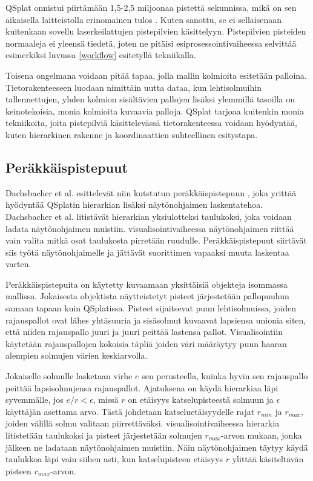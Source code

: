 QSplat onnistui piirtämään 1,5-2,5 miljoonaa pistettä sekunnissa, mikä on sen aikaisella laitteistolla erinomainen tulos \cite{qsplat}. Kuten sanottu, se ei sellaisenaan kuitenkaan sovellu laserkeilattujen pistepilvien käsittelyyn. Pistepilvien pisteiden normaaleja ei yleensä tiedetä, joten ne pitäisi esiprosessointivaiheessa selvittää esimerkiksi luvussa \ref{workflow} esitetyllä tekniikalla. 

Toisena ongelmana voidaan pitää tapaa, jolla mallin kolmioita esitetään palloina. Tietorakenteeseen luodaan nimittäin uutta dataa, kun lehtisolmuihin tallennettujen, yhden kolmion sisältävien pallojen lisäksi ylemmillä tasoilla on keinotekoisia, monia kolmioita kuvaavia palloja. QSplat tarjoaa kuitenkin monia tekniikoita, joita pistepilviä käsittelevässä tietorakenteessa voidaan hyödyntää, kuten hierarkinen rakenne ja koordinaattien suhteellinen esitystapa.

\subsection{Peräkkäispistepuut}
Dachsbacher et al. esittelevät niin kutstutun peräkkäispistepuun , joka yrittää hyödyntää QSplatin hierarkian lisäksi näytönohjaimen laskentatehoa. Dachsbacher et al. litistävät hierarkian yksiulotteksi taulukoksi, joka voidaan ladata näytönohjaimen muistiin. visualisointivaiheessa näytönohjaimen riittää vain valita mitkä osat taulukosta pirretään ruudulle. Peräkkäispistepuut siirtävät siis työtä näytönohjaimelle ja jättävät suorittimen vapaaksi muuta laskentaa varten. \cite{spt}

Peräkkäispistepuita on käytetty kuvaamaan yksittäisiä objekteja isommassa mallissa. Jokaisesta objektista näytteistetyt pisteet järjestetään pallopuuhun samaan tapaan kuin QSplatissa. Pisteet sijaitsevat puun lehtisolmuissa, joiden rajauspallot ovat lähes yhtäsuuria ja sisäsolmut kuvaavat lapsiensa unionia siten, että niiden rajauspallo juuri ja juuri peittää lastensa pallot. Visualisointiin käytetään rajauspallojen kokoisia täpliä joiden väri määräytyy puun haaran alempien solmujen värien keskiarvolla. \cite{spt}

Jokaiselle solmulle lasketaan virhe $e$ sen perusteella, kuinka hyvin sen rajauspallo peittää lapsisolmujensa rajauspallot. Ajatuksena on käydä hierarkiaa läpi syvemmälle, jos $e/r < \epsilon$, missä $r$ on etäisyys katselupisteestä solmuun ja $\epsilon$ käyttäjän asettama arvo. Tästä johdetaan katseluetäisyydelle rajat $r_{min}$ ja $r_{max}$, joiden välillä solmu valitaan piirrettäväksi. visualisointivaiheessa hierarkia litistetään taulukoksi ja pisteet järjestetään solmujen $r_{max}$-arvon mukaan, jonka jälkeen ne ladataan näytönohjaimen muistiin. Näin näytönohjaimen täytyy käydä taulukkoa läpi vain siihen asti, kun katselupisteen etäisyys $r$ ylittää käsiteltävän pisteen $r_{max}$-arvon. \cite{spt}

